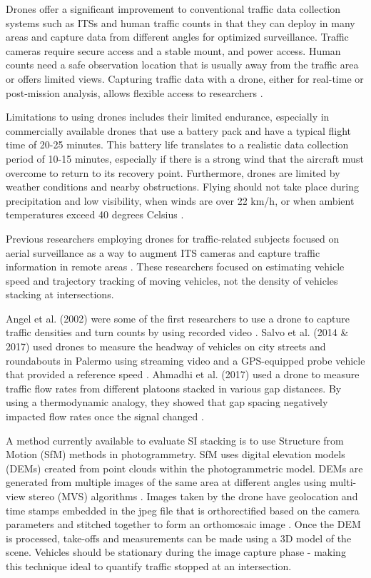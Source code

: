 Drones offer a significant improvement to conventional traffic data collection systems such as ITSs and human traffic counts in that they can deploy in many areas and capture data from different angles for optimized surveillance. Traffic cameras require secure access and a stable mount, and power access. Human counts need a safe observation location that is usually away from the traffic area or offers limited views. Capturing traffic data with a drone, either for real-time or post-mission analysis, allows flexible access to researchers \citep{Westoby2012}. 

Limitations to using drones includes their limited endurance, especially in commercially available drones that use a battery pack and have a typical flight time of 20-25 minutes. This battery life translates to a realistic data collection period of 10-15 minutes, especially if there is a strong wind that the aircraft must overcome to return to its recovery point. Furthermore, drones are limited by weather conditions and nearby obstructions. Flying should not take place during precipitation and low visibility, when winds are over 22 km/h, or when ambient temperatures exceed 40 degrees Celsius \citep{DJI2017}.

Previous researchers employing drones for traffic-related subjects focused on aerial surveillance as a way to augment ITS cameras and capture traffic information in remote areas \citep{Reinartz2006,  Liu2013, Barmpounakis2016, Barmpounakis2017}.  These researchers focused on estimating vehicle speed and trajectory tracking of moving vehicles, not the density of vehicles stacking at intersections.

Angel et al. (2002) were some of the first researchers to use a drone to capture traffic densities and turn counts by using recorded video \citep{Angel2002}. Salvo et al. (2014 \& 2017) used drones to measure the headway of vehicles on city streets and roundabouts in Palermo using streaming video and a GPS-equipped probe vehicle that provided a reference speed \citep{Salvo2014, Salvo2017}.  Ahmadhi et al. (2017) used a drone to measure traffic flow rates from different platoons stacked in various gap distances. By using a thermodynamic analogy, they showed that gap spacing negatively impacted flow rates once the signal changed \citep{Ahmadi2017}.

A method currently available to evaluate SI stacking is to use Structure from Motion (SfM) methods in photogrammetry. SfM uses digital elevation models (DEMs) created from point clouds within the photogrammetric model. DEMs are generated from multiple images of the same area at different angles using multi-view stereo (MVS) algorithms \citep{James2017}. Images taken by the drone have geolocation and time stamps embedded in the jpeg file that is orthorectified based on the camera parameters and stitched together to form an orthomosaic image \citep{Westoby2012}. Once the DEM is processed, take-offs and measurements can be made using a 3D model of the scene. Vehicles should be stationary during the image capture phase - making this technique ideal to quantify traffic stopped at an intersection.


